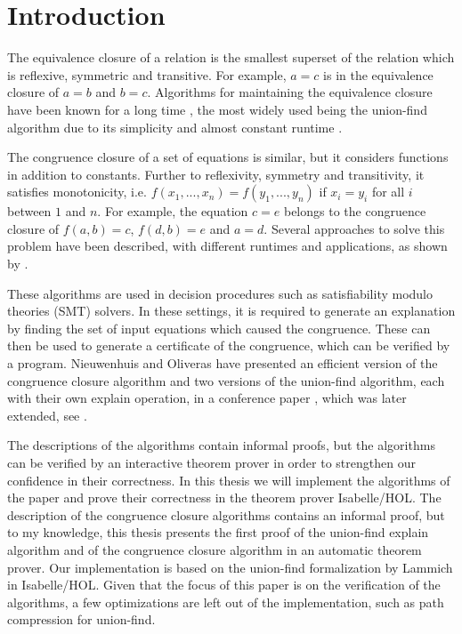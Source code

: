 
\chapter{Introduction}\label{chapter:introduction}

The equivalence closure of a relation is the smallest superset of the relation which is reflexive, symmetric and transitive. For example, $a = c$ is in the equivalence closure of $a = b$ and $b = c$. Algorithms for maintaining the equivalence closure have been known for a long time \cite{unionfind-og}, the most widely used being the union-find algorithm due to its simplicity and almost constant runtime \cite{Tarjan}.

The congruence closure of a set of equations is similar, but it considers functions in addition to constants. Further to reflexivity, symmetry and transitivity, it satisfies monotonicity, i.e. $f(x_1, ... ,x_n) = f(y_1, ... ,y_n)$ if $x_i = y_i$ for all $i$ between $1$ and $n$. \cite{Nieuwenhuis} For example, the equation $c = e$ belongs to the congruence closure of $f(a,b) = c$, $f(d,b) = e$ and $a = d$. Several approaches to solve this problem have been described, with different runtimes and applications, as shown by \cite{congruenceclosure-og2,congruenceclosure-og,congruenceclosure-og3,Nieuwenhuis}.

These algorithms are used in decision procedures such as satisfiability modulo theories (SMT) solvers. \cite{z3} In these settings, it is required to generate an explanation by finding the set of input equations which caused the congruence. These can then be used to generate a certificate of the congruence, which can be verified by a program. Nieuwenhuis and Oliveras have presented an efficient version of the congruence closure algorithm and two versions of the union-find algorithm, each with their own explain operation, in a conference paper \cite{Nieuwenhuis}, which was later extended, see \cite{Nieuwenhuis2}.

The descriptions of the algorithms contain informal proofs, but the algorithms can be verified by an interactive theorem prover in order to strengthen our confidence in their correctness. In this thesis we will implement the algorithms of the paper \cite{Nieuwenhuis} and prove their correctness in the theorem prover Isabelle/HOL.  The description of the congruence closure algorithms contains an informal proof, but to my knowledge, this thesis presents the first proof of the union-find explain algorithm and of the congruence closure algorithm in an automatic theorem prover. Our implementation is based on the union-find formalization by Lammich \cite{unionfind-isabelle} in Isabelle/HOL. Given that the focus of this paper is on the verification of the algorithms, a few optimizations are left out of the implementation, such as path compression for union-find.


